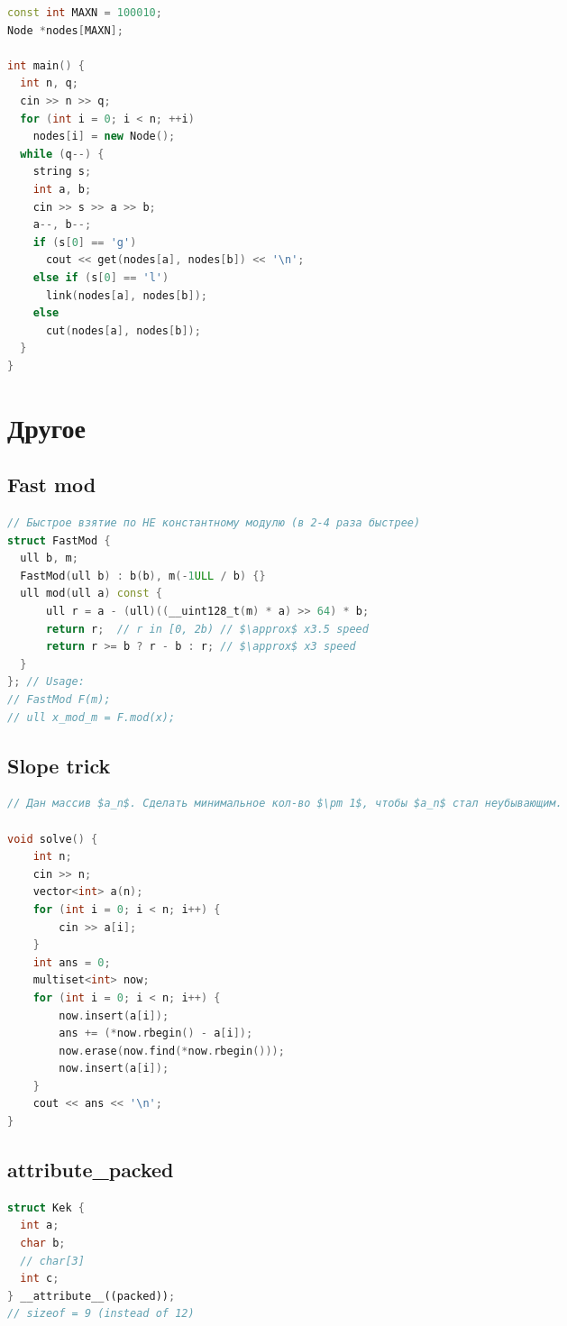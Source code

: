 \documentclass[9pt,a4paper,landscape,twosided]{extarticle}
\begin{document}
\begin{multicols*}{3}
\begin{lstlisting}[language=C++]
const int MAXN = 100010;
Node *nodes[MAXN];

int main() {
  int n, q;
  cin >> n >> q;
  for (int i = 0; i < n; ++i)
    nodes[i] = new Node();
  while (q--) {
    string s;
    int a, b;
    cin >> s >> a >> b;
    a--, b--;
    if (s[0] == 'g')
      cout << get(nodes[a], nodes[b]) << '\n';
    else if (s[0] == 'l')
      link(nodes[a], nodes[b]);
    else
      cut(nodes[a], nodes[b]);
  }
}

\end{lstlisting}

\section{Другое}

\subsection{Fast mod}
\begin{lstlisting}[language=C++]
// Быстрое взятие по НЕ константному модулю (в 2-4 раза быстрее)
struct FastMod {
  ull b, m;
  FastMod(ull b) : b(b), m(-1ULL / b) {}
  ull mod(ull a) const {
      ull r = a - (ull)((__uint128_t(m) * a) >> 64) * b;
      return r;  // r in [0, 2b) // $\approx$ x3.5 speed
      return r >= b ? r - b : r; // $\approx$ x3 speed
  }
}; // Usage:
// FastMod F(m);
// ull x_mod_m = F.mod(x);
\end{lstlisting}

\subsection{Slope trick}
\begin{lstlisting}[language=C++]
// Дан массив $a_n$. Сделать минимальное кол-во $\pm 1$, чтобы $a_n$ стал неубывающим.

void solve() {
    int n;
    cin >> n;
    vector<int> a(n);
    for (int i = 0; i < n; i++) {
        cin >> a[i];
    }
    int ans = 0;
    multiset<int> now;
    for (int i = 0; i < n; i++) {
        now.insert(a[i]);
        ans += (*now.rbegin() - a[i]);
        now.erase(now.find(*now.rbegin()));
        now.insert(a[i]);
    }
    cout << ans << '\n';
}
\end{lstlisting}

\subsection{attribute\_packed}
\begin{lstlisting}[language=C++]
struct Kek {
  int a;
  char b;
  // char[3]
  int c;
} __attribute__((packed));
// sizeof = 9 (instead of 12)
\end{lstlisting}


\end{multicols*}
\end{document}
